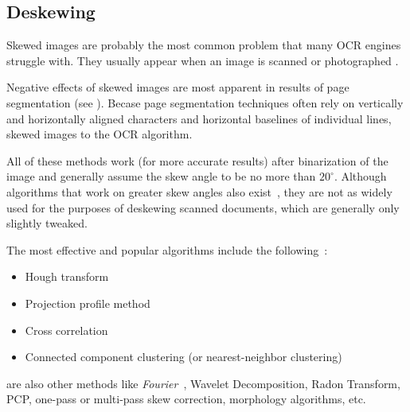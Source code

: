 \subsection{Deskewing} \label{deskewing}

Skewed images are probably the most common problem that many OCR engines struggle with. They usually appear when an image is scanned or photographed .

Negative effects of skewed images are most apparent in results of page segmentation (see ). Becase page segmentation techniques often rely on vertically and horizontally aligned characters and horizontal baselines of individual lines, skewed images  to the OCR algorithm. 

 All of these methods work (for more accurate results) after binarization of the image and generally assume the skew angle to be no more than $20^{\circ}$. Although algorithms that work on greater skew angles also exist~\citep{skewAngleDetection}, they are not as widely used for the purposes of deskewing scanned documents, which are generally only slightly tweaked.

The most effective and popular algorithms include the following~\citep{skewBestTechniques}:
\begin{itemize}
    \item Hough transform~\cite{houghTransform}
    \item Projection profile method~\cite{skewAngleDetection}
    \item Cross correlation~\cite{skewAngleDetection}
    \item Connected component clustering (or nearest-neighbor clustering)~\citep{skewClustering}
\end{itemize}
 are also other methods like \emph{Fourier}~\citep{fourierTransform}, Wavelet Decomposition, Radon Transform, PCP, one-pass or multi-pass skew correction, morphology algorithms, etc.

